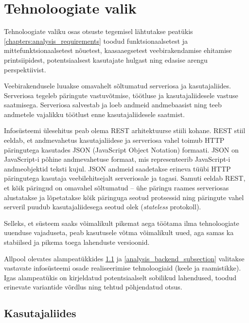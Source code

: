 \section{Tehnoloogiate valik}

Tehnoloogiate valiku osas otsuste tegemisel lähtutakse peatükis \ref{chapters:analysis_requirements} toodud
funktsionaalsetest ja mittefunktsionaalsetest nõuetest, kaasaaegsetest veebirakendamise ehitamise printsiipidest, 
potentsiaalsest kasutajate hulgast ning edasise arengu perspektiivist.

Veebirakendusele luuakse omavahelt sõltumatud serveriosa ja kasutajaliides. Serveriosa tegeleb päringute vastuvõtmise, 
töötluse ja kasutajaliidesele vastuse saatmisega. Serveriosa salvestab ja loeb andmeid andmebaasist ning 
teeb andmetele vajalikku töötlust enne kasutajaliidesele saatmist.

Infosüsteemi ülesehitus peab olema REST arhitektuurse stiili kohane. REST stiil eeldab, et andmevahetus 
kasutajaliidese ja serveriosa vahel toimub HTTP päringutega kasutades JSON (JavaScript Object Notation) formaati. 
JSON on JavaScript-i põhine andmevahetuse formaat, mis representeerib JavaScript-i andmeobjektid teksti kujul.
JSON andmeid saadetakse erineva tüübi HTTP päringutega kasutaja veebilehitsejalt 
serveriosale ja tagasi. Samuti eeldab REST, et kõik päringud on omavahel sõltumatud -- ühe päringu raames serveriosas 
alustatakse ja lõpetatakse kõik päringuga seotud protsessid ning päringute vahel serveril 
puudub kasutajaliidesega seotud olek (\textit{stateless} protokoll)\cite{about_rest}\cite{rest_apis_book}.

Selleks, et süsteem saaks võimalikult pikemat aega töötama ilma tehnoloogiate uuenduse vajaduseta,
peab kasutusele võtma võimalikult uued, aga samas ka stabiilsed ja pikema toega lahenduste versioonid. 

Allpool olevates alampeatükkides \ref{analysis_interface_subsection} ja \ref{analysis_backend_subsection} valitakse 
vastavate infosüsteemi osade realiseerimise tehnoloogiaid (keele ja raamistikke). Igas alampeatükis on 
kirjeldatud potentsiaalselt sobilikud lahendused, toodud erinevate variantide võrdlus ning tehtud põhjendatud otsus.

\subsection{Kasutajaliides}
\label{analysis_interface_subsection}

